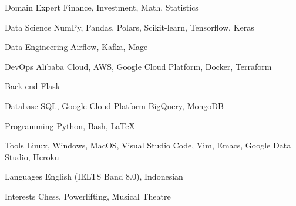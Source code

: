 

\begin{cvskills}

  \cvskill
    {Domain Expert} %
    {Finance, Investment, Math, Statistics} %

  \cvskill
    {Data Science} %
    {NumPy, Pandas, Polars, Scikit-learn, Tensorflow, Keras} %

  \cvskill
    {Data Engineering} %
    {Airflow, Kafka, Mage} %

  \cvskill
    {DevOps} %
    {Alibaba Cloud, AWS, Google Cloud Platform, Docker, Terraform} %

  \cvskill
    {Back-end} %
    {Flask} %

  \cvskill
    {Database} %
    {SQL, Google Cloud Platform BigQuery, MongoDB} %

  \cvskill
    {Programming} %
    {Python, Bash, LaTeX} %

  \cvskill
    {Tools} %
    {Linux, Windows, MacOS, Visual Studio Code, Vim, Emacs, Google Data Studio, Heroku} %

  \cvskill
    {Languages} %
    {English (IELTS Band 8.0), Indonesian} %

  \cvskill
    {Interests} %
    {Chess, Powerlifting, Musical Theatre} %

\end{cvskills}
